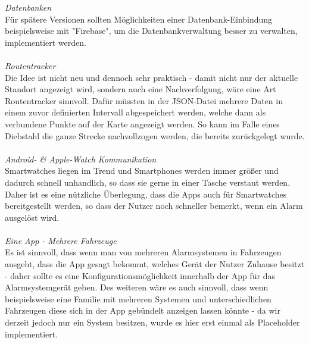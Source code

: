 \textit{Datenbanken}
\\
Für spätere Versionen sollten  Möglichkeiten einer Datenbank-Einbindung beispielsweise mit "Firebase", um die Datenbankverwaltung besser zu verwalten, implementiert werden. 
\\
\\
\textit{Routentracker}
\\
Die Idee ist nicht neu und dennoch sehr praktisch - damit nicht nur der aktuelle Standort angezeigt wird, sondern auch eine Nachverfolgung, wäre eine Art Routentracker sinnvoll. Dafür müssten in der JSON-Datei mehrere Daten in einem zuvor definierten Intervall abgespeichert werden, welche dann als verbundene Punkte auf der Karte angezeigt werden. So kann im Falle eines Diebstahl die ganze Strecke nachvollzogen werden, die bereits zurückgelegt wurde.
\\
\\
\textit{Android- \& Apple-Watch Kommunikation}
\\
Smartwatches liegen im Trend und Smartphones werden immer größer und dadurch schnell unhandlich, so dass sie gerne in einer Tasche verstaut werden. Daher ist es eine nützliche Überlegung, dass die Apps auch für Smartwatches bereitgestellt werden, so dass der Nutzer noch schneller bemerkt, wenn ein Alarm ausgelöst wird.
\\
\\
\textit{Eine App - Mehrere Fahrzeuge}
\\
Es ist sinnvoll, dass wenn man von mehreren Alarmsystemen in Fahrzeugen ausgeht, dass die App gesagt bekommt, welches Gerät der Nutzer Zuhause besitzt - daher sollte es eine Konfigurationsmöglichkeit innerhalb der App für das Alarmsystemgerät geben. Des weiteren wäre es auch sinnvoll, dass wenn beispielsweise eine Familie mit mehreren Systemen und unterschiedlichen Fahrzeugen diese sich in der App  gebündelt anzeigen lassen könnte - da wir derzeit jedoch nur ein System besitzen, wurde es hier erst einmal als Placeholder implementiert.
